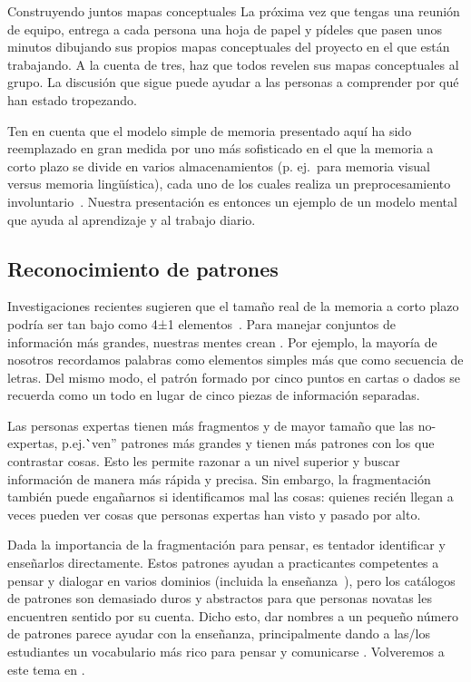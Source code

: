 
\begin{aside}{Construyendo juntos mapas conceptuales}
 La próxima vez que tengas una reunión de equipo,
 entrega a cada persona una hoja de papel
 y pídeles que pasen unos minutos dibujando sus propios mapas conceptuales del proyecto en el que están trabajando.
  A la cuenta de tres,
  haz que todos revelen sus mapas conceptuales al grupo.
  La discusión que sigue puede ayudar a las personas a comprender
  por qué han estado tropezando.
\end{aside}

Ten en cuenta que el modelo simple de memoria presentado aquí ha sido reemplazado en gran medida por uno más sofisticado
en el que la memoria a corto plazo se divide en varios almacenamientos
(p. ej.\ para memoria visual versus memoria lingüística),
cada uno de los cuales realiza un preprocesamiento involuntario~\cite{Mill2016a}.
Nuestra presentación es entonces un ejemplo de un modelo mental que ayuda al aprendizaje y al trabajo diario.

\subsection*{Reconocimiento de patrones}

Investigaciones recientes sugieren que el tamaño real de la memoria a corto plazo 
podría ser tan bajo como 4±1 elementos~\cite{Dida2016}.
Para manejar conjuntos de información más grandes,
nuestras mentes crean .
Por ejemplo,
la mayoría de nosotros recordamos palabras como elementos simples más que como secuencia de letras.
Del mismo modo,
el patrón formado por cinco puntos en cartas o dados se recuerda como un todo 
en lugar de cinco piezas de información separadas.

Las personas expertas tienen más fragmentos y de mayor tamaño que las no-expertas,
p.ej.\``ven'' patrones más grandes y tienen más patrones con los que contrastar cosas.
Esto les permite razonar a un nivel superior
y buscar información de manera más rápida y precisa.
Sin embargo,
la fragmentación también puede engañarnos si identificamos mal las cosas:
quienes recién llegan a veces pueden ver cosas que personas expertas han visto y pasado por alto.

Dada la importancia de la fragmentación para pensar,
es tentador identificar 
y enseñarlos directamente. 
Estos patrones ayudan a practicantes competentes a pensar y dialogar en varios dominios (incluida la enseñanza~\cite{Berg2012}),
pero los catálogos de patrones son demasiado duros y abstractos para que personas novatas les encuentren sentido por su cuenta.
Dicho esto,
dar nombres a un pequeño número de patrones parece ayudar con la enseñanza,
principalmente dando a las/los estudiantes un vocabulario más rico para pensar y comunicarse \cite{Kuit2004,Byck2005,Saja2006}.
Volveremos a este tema en .


